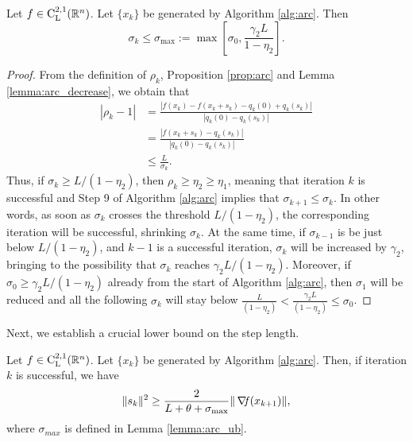 \documentclass[10pt,a4paper]{article}
\begin{document}
\begin{lemma}\label{lemma:arc_ub}
	Let $f\in \mathord{\mathrm{C^{2,1}_{L}}}(\mathbb{R}^n)$. Let $\{x_k\}$ be generated by Algorithm \ref{alg:arc}. Then
	\begin{equation*}
		\sigma_k \leq \sigma_{\max} :=\max \left[ \sigma_0, \frac{\gamma_2 L}{1 - \eta_2} \right].
	\end{equation*}
\end{lemma}
\begin{proof}
	From the definition of $\rho_k$, Proposition \ref{prop:arc} and Lemma \ref{lemma:arc_decrease}, we obtain that
	\begin{align*}
		|\rho_k - 1| &= \frac{|f(x_k) - f(x_k + s_k) - q_k(0) + q_k(s_k)|}{|q_k(0) - q_k(s_k)|} \\
		&= \frac{|f(x_k + s_k) - q_k(s_k)|}{|q_k(0) - q_k(s_k)|} \\
		&\leq \frac{L}{\sigma_k}.
	\end{align*}
	Thus, if $\sigma_k \geq L/(1 - \eta_2)$, then $\rho_k \geq \eta_2\geq\eta_1$, meaning that iteration $k$ is successful and Step 9 of Algorithm \ref{alg:arc} implies that $\sigma_{k+1} \leq \sigma_k$. In other words, as soon as $\sigma_k$ crosses the threshold $L/(1 - \eta_2)$, the corresponding iteration will be successful, shrinking $\sigma_k$. At the same time, if $\sigma_{k-1}$ is be just below $L/(1 - \eta_2)$, and $k-1$ is a successful iteration, $\sigma_k$ will be increased by $\gamma_2$, bringing to the possibility that $\sigma_k$ reaches $\gamma_2L/(1 - \eta_2)$. Moreover, if $\sigma_0\geq \gamma_2L/(1 - \eta_2)$ already from the start of Algorithm \ref{alg:arc}, then $\sigma_1$ will be reduced and all the following $\sigma_k$ will stay below $\frac{L}{(1 - \eta_2)}<\frac{\gamma_2L}{(1 - \eta_2)}\leq \sigma_0$. 	 
\end{proof}

\noindent Next, we establish a crucial lower bound on the step length.

\begin{lemma}\label{lemma:arc_lb}
	Let $f\in \mathord{\mathrm{C^{2,1}_{L}}}(\mathbb{R}^n)$. Let $\{x_k\}$ be generated by Algorithm \ref{alg:arc}. Then, if iteration $k$ is successful, we have
	\begin{equation*}
		\|s_k\|^2 \geq \frac{2}{L + \theta + \sigma_{\max}} \|\operatorname*{\mathit{\nabla \!f}}(x_{k+1})\|,
	\end{equation*}
where $\sigma_{max}$ is defined in Lemma \ref{lemma:arc_ub}.
\end{lemma}
\end{document}
